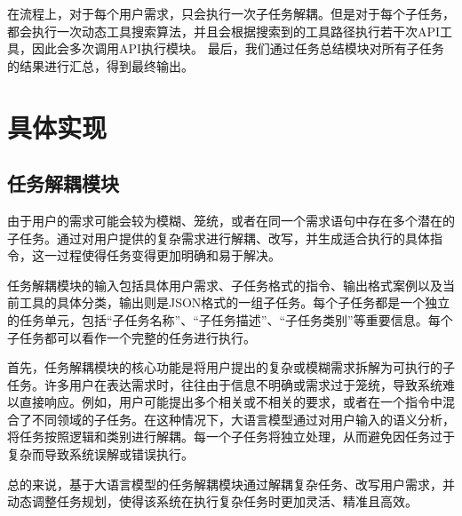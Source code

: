 在流程上，对于每个用户需求，只会执行一次子任务解耦。但是对于每个子任务，都会执行一次动态工具搜索算法，并且会根据搜索到的工具路径执行若干次API工具，因此会多次调用API执行模块。
最后，我们通过任务总结模块对所有子任务的结果进行汇总，得到最终输出。

\section{具体实现}

\subsection{任务解耦模块}

由于用户的需求可能会较为模糊、笼统，或者在同一个需求语句中存在多个潜在的子任务。通过对用户提供的复杂需求进行解耦、改写，并生成适合执行的具体指令，这一过程使得任务变得更加明确和易于解决。

任务解耦模块的输入包括具体用户需求、子任务格式的指令、输出格式案例以及当前工具的具体分类，输出则是JSON格式的一组子任务。每个子任务都是一个独立的任务单元，包括“子任务名称”、“子任务描述”、“子任务类别”等重要信息。每个子任务都可以看作一个完整的任务进行执行。

首先，任务解耦模块的核心功能是将用户提出的复杂或模糊需求拆解为可执行的子任务。许多用户在表达需求时，往往由于信息不明确或需求过于笼统，导致系统难以直接响应。例如，用户可能提出多个相关或不相关的要求，或者在一个指令中混合了不同领域的子任务。在这种情况下，大语言模型通过对用户输入的语义分析，将任务按照逻辑和类别进行解耦。每一个子任务将独立处理，从而避免因任务过于复杂而导致系统误解或错误执行。

总的来说，基于大语言模型的任务解耦模块通过解耦复杂任务、改写用户需求，并动态调整任务规划，使得该系统在执行复杂任务时更加灵活、精准且高效。





